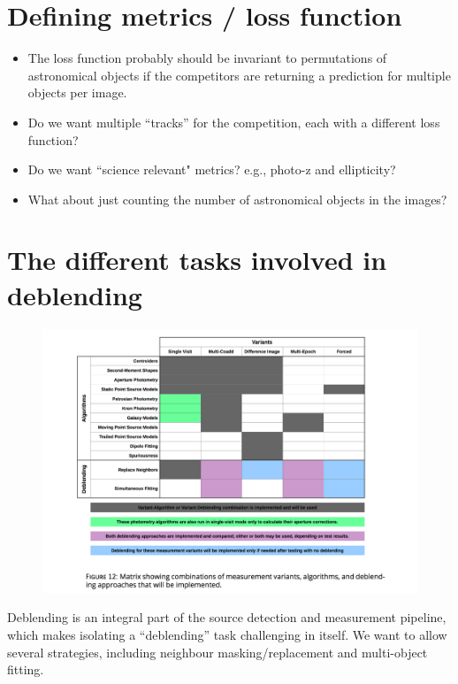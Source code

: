 \documentclass[10pt,letter]{article}
\begin{document}
\section{Defining metrics / loss function}
\begin{itemize}
\item The loss function probably should be invariant to permutations of astronomical objects if the competitors are returning a prediction for multiple objects per image.
\item Do we want multiple ``tracks'' for the competition, each with a different loss function?
\item Do we want ``science relevant" metrics? e.g., photo-z and ellipticity?
\item What about just counting the number of astronomical objects in the images?
\end{itemize}

\section{The different tasks involved in deblending}

\begin{figure}
    \centering
    \includegraphics[width=\textwidth]{figures/Figure12LDM-151.png}
    \label{fig:DM-fig12}
\end{figure}

Deblending is an integral part of the source detection and measurement pipeline, which makes isolating a ``deblending'' task challenging in itself. We want to allow several strategies, including neighbour masking/replacement and multi-object fitting.
\end{document}
